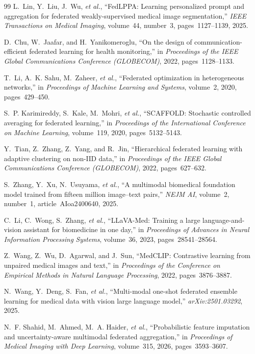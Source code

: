 \documentclass[letterpaper, conference]{IEEEtran}
\begin{document}
\begin{thebibliography}{99}
L.~Lin, Y.~Liu, J.~Wu, \emph{et al.}, ``FedLPPA: Learning personalized prompt and aggregation for federated weakly-supervised medical image segmentation,'' \emph{IEEE Transactions on Medical Imaging}, volume~44, number~3, pages~1127--1139, 2025.

D.~Chu, W.~Jaafar, and H.~Yanikomeroglu, ``On the design of communication-efficient federated learning for health monitoring,'' in \emph{Proceedings of the IEEE Global Communications Conference (GLOBECOM)}, 2022, pages~1128--1133.

T.~Li, A.~K. Sahu, M.~Zaheer, \emph{et al.}, ``Federated optimization in heterogeneous networks,'' in \emph{Proceedings of Machine Learning and Systems}, volume~2, 2020, pages~429--450.

S.~P. Karimireddy, S.~Kale, M.~Mohri, \emph{et al.}, ``SCAFFOLD: Stochastic controlled averaging for federated learning,'' in \emph{Proceedings of the International Conference on Machine Learning}, volume~119, 2020, pages~5132--5143.

Y.~Tian, Z.~Zhang, Z.~Yang, and R.~Jin, ``Hierarchical federated learning with adaptive clustering on non-IID data,'' in \emph{Proceedings of the IEEE Global Communications Conference (GLOBECOM)}, 2022, pages~627--632.

S.~Zhang, Y.~Xu, N.~Usuyama, \emph{et al.}, ``A multimodal biomedical foundation model trained from fifteen million image--text pairs,'' \emph{NEJM AI}, volume~2, number~1, article~AIoa2400640, 2025.

C.~Li, C.~Wong, S.~Zhang, \emph{et al.}, ``LLaVA-Med: Training a large language-and-vision assistant for biomedicine in one day,'' in \emph{Proceedings of Advances in Neural Information Processing Systems}, volume~36, 2023, pages~28541--28564.

Z.~Wang, Z.~Wu, D.~Agarwal, and J.~Sun, ``MedCLIP: Contrastive learning from unpaired medical images and text,'' in \emph{Proceedings of the Conference on Empirical Methods in Natural Language Processing}, 2022, pages~3876--3887.

N.~Wang, Y.~Deng, S.~Fan, \emph{et al.}, ``Multi-modal one-shot federated ensemble learning for medical data with vision large language model,'' \emph{arXiv:2501.03292}, 2025.

N.~F. Shahid, M.~Ahmed, M.~A. Haider, \emph{et al.}, ``Probabilistic feature imputation and uncertainty-aware multimodal federated aggregation,'' in \emph{Proceedings of Medical Imaging with Deep Learning}, volume~315, 2026, pages~3593--3607.


\end{thebibliography}
\end{document}

